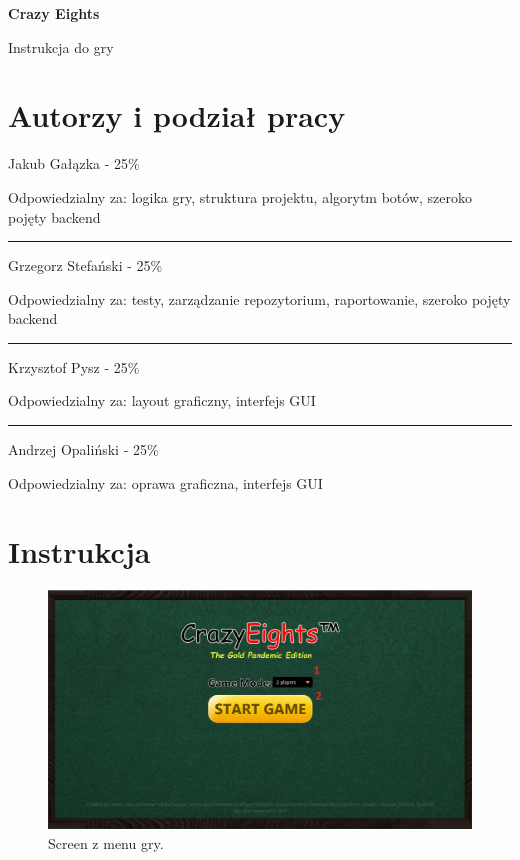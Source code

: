 \documentclass[12pt]{article}
\begin{document}
	\begin{center}
		\Huge
		\textbf{Crazy Eights}
		
		\LARGE
		Instrukcja do gry
	\end{center}

	\section*{Autorzy i podział pracy}
	
	Jakub Gałązka - 25\%
	
	\noindent Odpowiedzialny za: logika gry, struktura projektu, algorytm botów, szeroko pojęty backend
	
	\noindent\rule{\textwidth}{0.4pt}
	
	\noindent Grzegorz Stefański - 25\%
	
	\noindent Odpowiedzialny za: testy, zarządzanie repozytorium, raportowanie, szeroko pojęty backend
	
	\noindent\rule{\textwidth}{0.4pt}
	
	\noindent Krzysztof Pysz - 25\%
	
	\noindent Odpowiedzialny za: layout graficzny, interfejs GUI
	
	\noindent\rule{\textwidth}{0.4pt}
	
	\noindent Andrzej Opaliński - 25\%
	
	\noindent Odpowiedzialny za: oprawa graficzna, interfejs GUI
	
	\section*{Instrukcja}
	
	\begin{figure}[h]
		\centering
		\renewcommand*{\figurename}{Fig.} 
		\includegraphics[width=\textwidth]{img/menu.png}
		\caption{Screen z menu gry.}
		\label{}
	\end{figure}
	
\end{document}
